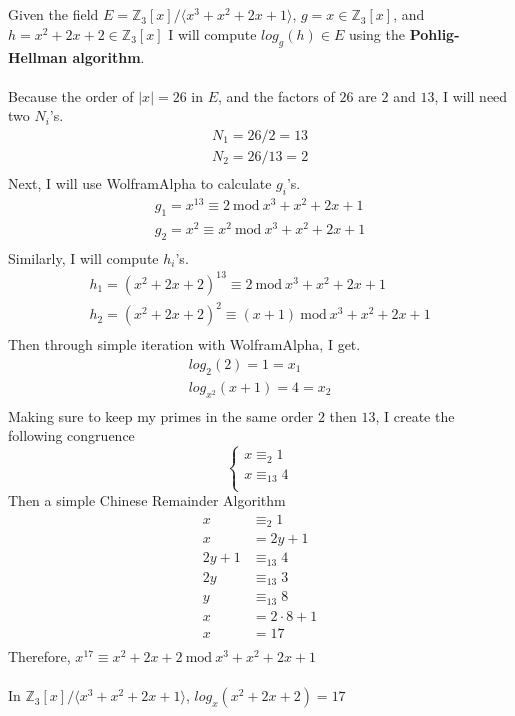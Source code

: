 \documentclass{article}
\begin{document}
\section{}
Given the field $E = \mathbb{Z}_3[x]/\langle x^3 + x^2 + 2x + 1 \rangle$,
$g = x \in \mathbb{Z}_3[x]$,
and $h = x^2 + 2x + 2 \in \mathbb{Z}_3[x]$
I will compute $log_g(h) \in E$
using the \textbf{Pohlig-Hellman algorithm}.
\\
\\
Because the order of $|x| = 26$ in $E$, and the factors of $26$ are $2$ and $13$,
I will need two $N_i$'s.
\[
\begin{split}
N_1 = 26/2 = 13 \\
N_2 = 26/13 = 2 \\
\end{split}
\]
Next, I will use WolframAlpha to calculate $g_i$'s.
\[
\begin{split}
g_1 = x^{13} \equiv 2\ \textrm{mod}\ x^3 + x^2 + 2x + 1 \\
g_2 = x^2 \equiv x^2\ \textrm{mod}\ x^3 + x^2 + 2x + 1 \\
\end{split}
\]
Similarly, I will compute $h_i$'s.
\[
\begin{split}
h_1 = (x^2 + 2x + 2)^{13} \equiv 2\ \textrm{mod}\ x^3 + x^2 + 2x + 1 \\
h_2 = (x^2 + 2x + 2)^2 \equiv (x+1)\ \textrm{mod}\ x^3 + x^2 + 2x + 1 \\
\end{split}
\]
Then through simple iteration with WolframAlpha, I get.
\[
\begin{split}
log_{2}(2) = 1 = x_1 \\
log_{x^2}(x+1) = 4 = x_2 \\
\end{split}
\]
Making sure to keep my primes in the same order $2$ then $13$,
I create the following congruence
\[
\begin{cases}
	x \equiv_2 1 \\
	x \equiv_{13} 4 \\
\end{cases}
\]
Then a simple Chinese Remainder Algorithm
\[
\begin{split}
x &\equiv_2 1 \\
x &= 2y + 1 \\
2y + 1 &\equiv_{13} 4 \\
2y &\equiv_{13} 3 \\
y &\equiv_{13} 8 \\
x &= 2 \cdot 8 + 1 \\
x &= 17 \\
\end{split}
\]
Therefore, $x^{17} \equiv x^2 + 2x + 2\ \textrm{mod}\ x^3 + x^2 + 2x + 1$
\\
\\
In $\mathbb{Z}_3[x]/\langle x^3 + x^2 + 2x + 1 \rangle $, $log_{x}(x^2 + 2x + 2) = 17$
\end{document}

